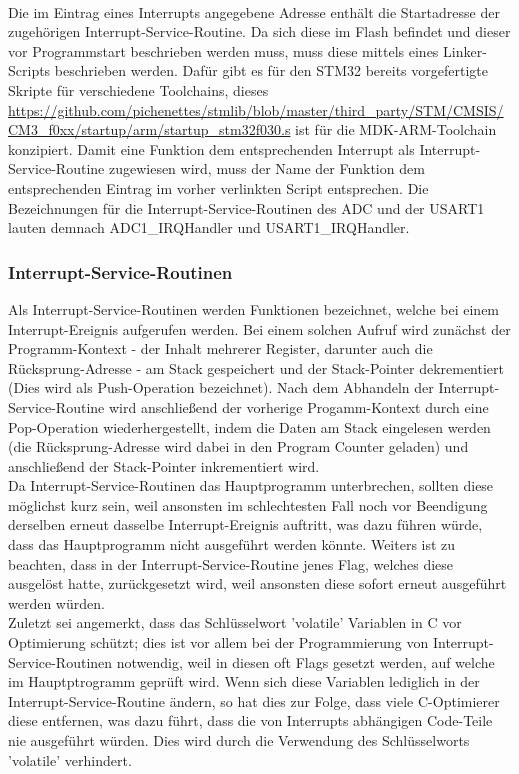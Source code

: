 \documentclass[11pt]{report}
\begin{document}
				\\Die im Eintrag eines Interrupts angegebene Adresse enthält die Startadresse der zugehörigen Interrupt-Service-Routine. Da sich diese im Flash befindet und dieser vor Programmstart beschrieben werden muss, muss diese mittels eines Linker-Scripts beschrieben werden. Dafür gibt es für den STM32 bereits vorgefertigte Skripte für verschiedene Toolchains, dieses \url{https://github.com/pichenettes/stmlib/blob/master/third_party/STM/CMSIS/CM3_f0xx/startup/arm/startup_stm32f030.s} ist für die MDK-ARM-Toolchain konzipiert. Damit eine Funktion dem entsprechenden Interrupt als Interrupt-Service-Routine zugewiesen wird, muss der Name der Funktion dem entsprechenden Eintrag im vorher verlinkten Script entsprechen. Die Bezeichnungen für die Interrupt-Service-Routinen des ADC und der USART1 lauten demnach ADC1\_IRQHandler und USART1\_IRQHandler.
			\subsubsection{Interrupt-Service-Routinen}
				Als Interrupt-Service-Routinen werden Funktionen bezeichnet, welche bei einem Interrupt-Ereignis aufgerufen werden. Bei einem solchen Aufruf wird zunächst der Programm-Kontext - der Inhalt mehrerer Register, darunter auch die Rücksprung-Adresse - am Stack gespeichert und der Stack-Pointer dekrementiert (Dies wird als Push-Operation bezeichnet). Nach dem Abhandeln der Interrupt-Service-Routine wird anschließend der vorherige Progamm-Kontext durch eine Pop-Operation wiederhergestellt, indem die Daten am Stack eingelesen werden (die Rücksprung-Adresse wird dabei in den Program Counter geladen) und anschließend der Stack-Pointer inkrementiert wird.\\
				Da Interrupt-Service-Routinen das Hauptprogramm unterbrechen, sollten diese möglichst kurz sein, weil ansonsten im schlechtesten Fall noch vor Beendigung derselben erneut dasselbe Interrupt-Ereignis auftritt, was dazu führen würde, dass das Hauptprogramm nicht ausgeführt werden könnte. Weiters ist zu beachten, dass in der Interrupt-Service-Routine jenes Flag, welches diese ausgelöst hatte, zurückgesetzt wird, weil ansonsten diese sofort erneut ausgeführt werden würden.\\
				Zuletzt sei angemerkt, dass das Schlüsselwort 'volatile' Variablen in C vor Optimierung schützt; dies ist vor allem bei der Programmierung von Interrupt-Service-Routinen notwendig, weil in diesen oft Flags gesetzt werden, auf welche im Hauptptrogramm geprüft wird. Wenn sich diese Variablen lediglich in der Interrupt-Service-Routine ändern, so hat dies zur Folge, dass viele C-Optimierer diese entfernen, was dazu führt, dass die von Interrupts abhängigen Code-Teile nie ausgeführt würden. Dies wird durch die Verwendung des Schlüsselworts 'volatile' verhindert.
\end{document}

